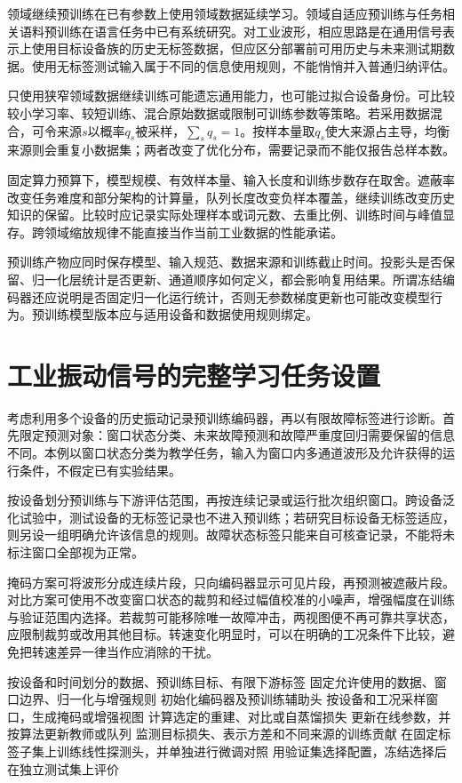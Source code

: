 领域继续预训练在已有参数上使用领域数据延续学习。领域自适应预训练与任务相关语料预训练在语言任务中已有系统研究\cite{gururangan2020dontstop}。对工业波形，相应思路是在通用信号表示上使用目标设备族的历史无标签数据，但应区分部署前可用历史与未来测试期数据。使用无标签测试输入属于不同的信息使用规则，不能悄悄并入普通归纳评估。

只使用狭窄领域数据继续训练可能遗忘通用能力，也可能过拟合设备身份。可比较较小学习率、较短训练、混合原始数据或限制可训练参数等策略。若采用数据混合，可令来源$s$以概率$q_s$被采样，$\sum_sq_s=1$。按样本量取$q_s$使大来源占主导，均衡来源则会重复小数据集；两者改变了优化分布，需要记录而不能仅报告总样本数。

固定算力预算下，模型规模、有效样本量、输入长度和训练步数存在取舍。遮蔽率改变任务难度和部分架构的计算量，队列长度改变负样本覆盖，继续训练改变历史知识的保留。比较时应记录实际处理样本或词元数、去重比例、训练时间与峰值显存。跨领域缩放规律不能直接当作当前工业数据的性能承诺。

预训练产物应同时保存模型、输入规范、数据来源和训练截止时间。投影头是否保留、归一化层统计是否更新、通道顺序如何定义，都会影响复用结果。所谓冻结编码器还应说明是否固定归一化运行统计，否则无参数梯度更新也可能改变模型行为。预训练模型版本应与适用设备和数据使用规则绑定。

\section{工业振动信号的完整学习任务设置}
考虑利用多个设备的历史振动记录预训练编码器，再以有限故障标签进行诊断。首先限定预测对象：窗口状态分类、未来故障预测和故障严重度回归需要保留的信息不同。本例以窗口状态分类为教学任务，输入为窗口内多通道波形及允许获得的运行条件，不假定已有实验结果。

按设备划分预训练与下游评估范围，再按连续记录或运行批次组织窗口。跨设备泛化试验中，测试设备的无标签记录也不进入预训练；若研究目标设备无标签适应，则另设一组明确允许该信息的规则。故障状态标签只能来自可核查记录，不能将未标注窗口全部视为正常。

掩码方案可将波形分成连续片段，只向编码器显示可见片段，再预测被遮蔽片段。对比方案可使用不改变窗口状态的裁剪和经过幅值校准的小噪声，增强幅度在训练与验证范围内选择。若裁剪可能移除唯一故障冲击，两视图便不再可靠共享状态，应限制裁剪或改用其他目标。转速变化明显时，可以在明确的工况条件下比较，避免把转速差异一律当作应消除的干扰。

\begin{algorithm}[htbp]
\caption{工业信号预训练与下游表示评价}
\label{alg:industrial-pretraining}
\begin{algorithmic}[1]
\Require 按设备和时间划分的数据、预训练目标、有限下游标签
\State 固定允许使用的数据、窗口边界、归一化与增强规则
\State 初始化编码器及预训练辅助头
 \State 按设备和工况采样窗口，生成掩码或增强视图
 \State 计算选定的重建、对比或自蒸馏损失
 \State 更新在线参数，并按算法更新教师或队列
 \State 监测目标损失、表示方差和不同来源的训练贡献
\EndFor
\State 在固定标签子集上训练线性探测头，并单独进行微调对照
\State 用验证集选择配置，冻结选择后在独立测试集上评价
\end{algorithmic}
\end{algorithm}

